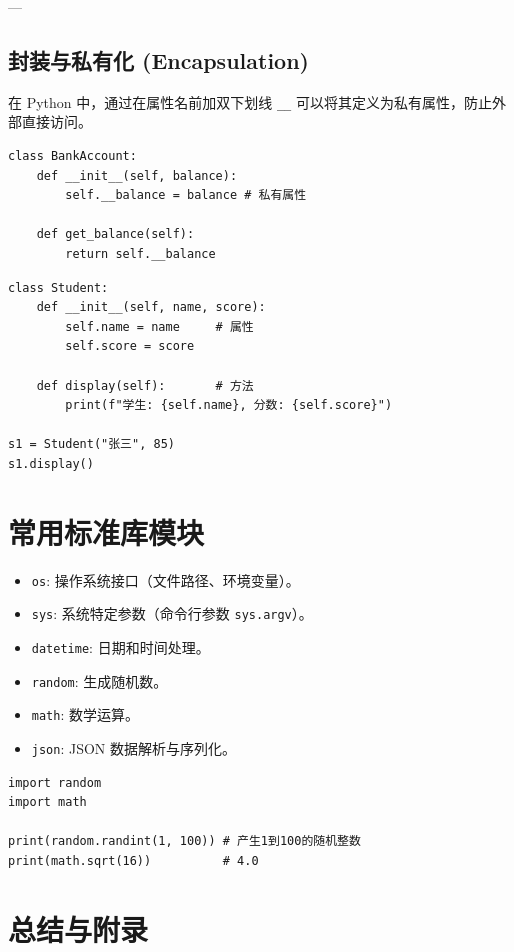 \documentclass{article}
\begin{document}
---

\subsection{封装与私有化 (Encapsulation)}

在 Python 中，通过在属性名前加双下划线 \texttt{\_\_} 可以将其定义为私有属性，防止外部直接访问。

\begin{lstlisting}
class BankAccount:
    def __init__(self, balance):
        self.__balance = balance # 私有属性

    def get_balance(self):
        return self.__balance
\end{lstlisting}
\begin{lstlisting}
class Student:
    def __init__(self, name, score):
        self.name = name     # 属性
        self.score = score
    
    def display(self):       # 方法
        print(f"学生: {self.name}, 分数: {self.score}")

s1 = Student("张三", 85)
s1.display()
\end{lstlisting}

\section{常用标准库模块}


\begin{itemize}
    \item \texttt{os}: 操作系统接口（文件路径、环境变量）。
    \item \texttt{sys}: 系统特定参数（命令行参数 \texttt{sys.argv}）。
    \item \texttt{datetime}: 日期和时间处理。
    \item \texttt{random}: 生成随机数。
    \item \texttt{math}: 数学运算。
    \item \texttt{json}: JSON 数据解析与序列化。
\end{itemize}

\begin{lstlisting}[caption=模块使用示例]
import random
import math

print(random.randint(1, 100)) # 产生1到100的随机整数
print(math.sqrt(16))          # 4.0
\end{lstlisting}

\section{总结与附录}
\end{document}
